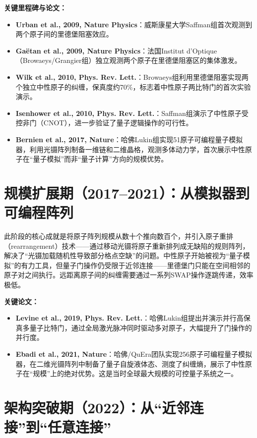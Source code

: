 \documentclass[11pt,a4paper]{ctexart}
\begin{document}
\textbf{关键里程碑与论文：}
\begin{itemize}
\item \textbf{Urban et al., 2009, Nature Physics}：威斯康星大学Saffman组首次观测到两个原子间的里德堡阻塞效应。
\item \textbf{Ga\"etan et al., 2009, Nature Physics}：法国Institut d'Optique（Browaeys/Grangier组）独立观测两个原子在里德堡阻塞区的集体激发。
\item \textbf{Wilk et al., 2010, Phys. Rev. Lett.}：Browaeys组利用里德堡阻塞实现两个独立中性原子的纠缠，保真度约70\%，标志着中性原子两比特门的首次实验演示。
\item \textbf{Isenhower et al., 2010, Phys. Rev. Lett.}：Saffman组演示了中性原子受控非门（CNOT），进一步验证了量子逻辑操作的可行性。
\item \textbf{Bernien et al., 2017, Nature}：哈佛Lukin组实现51原子可编程量子模拟器，利用光镊阵列制备一维链和二维晶格，观测多体动力学，首次展示中性原子在``量子模拟''而非``量子计算''方向的规模优势。
\end{itemize}

\section{规模扩展期（2017--2021）：从模拟器到可编程阵列}

此阶段的核心成就是将原子阵列规模从数十个推向数百个，并引入原子重排（rearrangement）技术——通过移动光镊将原子重新排列成无缺陷的规则阵列，解决了``光镊加载随机性导致部分格点空缺''的问题。中性原子开始被视为``量子模拟''的有力工具，但量子门操作仍受限于近邻连接——里德堡门只能在空间相邻的原子对之间执行。远距离原子间的纠缠需要通过一系列SWAP操作逐跳传递，效率极低。

\textbf{关键论文：}
\begin{itemize}
\item \textbf{Levine et al., 2019, Phys. Rev. Lett.}：哈佛Lukin组提出并演示并行高保真多量子比特门，通过全局激光脉冲同时驱动多对原子，大幅提升了门操作的并行度。
\item \textbf{Ebadi et al., 2021, Nature}：哈佛/QuEra团队实现256原子可编程量子模拟器，在二维光镊阵列中制备了量子自旋液体态、测度了纠缠熵，展示了中性原子在``规模''上的绝对优势。这是当时全球最大规模的可控量子系统之一。
\end{itemize}

\section{架构突破期（2022）：从``近邻连接''到``任意连接''}
\end{document}
